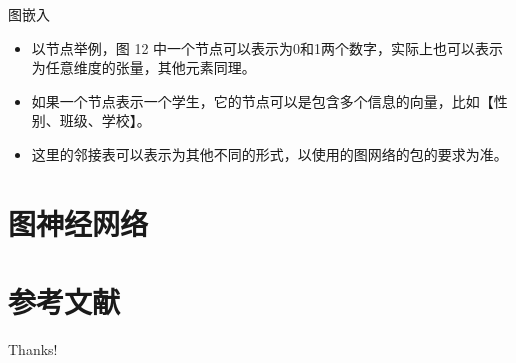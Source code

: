 \documentclass{beamer}
\begin{document}
\begin{frame}{图嵌入}
    \begin{itemize}[<+-| alert@+>]
        \item 以节点举例，图 12 中一个节点可以表示为0和1两个数字，实际上也可以表示为任意维度的张量，其他元素同理。
        \item 如果一个节点表示一个学生，它的节点可以是包含多个信息的向量，比如【性别、班级、学校】。
        \item 这里的邻接表可以表示为其他不同的形式，以使用的图网络的包的要求为准。
    \end{itemize}
\end{frame}

\section{图神经网络}

\begin{frame}

\end{frame}

\section{参考文献}

\begin{frame} %
    
    
\end{frame}

\begin{frame}
    \begin{center}
        {\Huge\calligra Thanks!}
    \end{center}
\end{frame}
\end{document}
